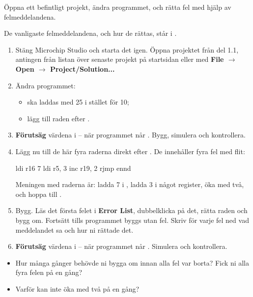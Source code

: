 
\label{lab3:d1-2}
Öppna ett befintligt projekt, ändra programmet, och rätta fel med hjälp av felmeddelandena.

De vanligaste felmeddelandena, och hur de rättas, står i .

\begin{enumerate}
  \item Stäng Microchip Studio och starta det igen. Öppna projektet från del 1.1, antingen från
    listan över senaste projekt på startsidan eller med \textbf{File $\rightarrow$ Open
    $\rightarrow$ Project/Solution...}
  \item Ändra programmet:
    \begin{itemize}
      \item {} ska laddas med 25 i stället för 10;
      \item lägg till raden  efter .
    \end{itemize}
  \item \textbf{Förutsäg} värdena i -- när programmet når . Bygg,
    simulera och kontrollera.
  \item Lägg nu till de här fyra raderna direkt efter . De innehåller fyra fel
    med flit:
\begin{asmcode}
    ldi r16 7
    ldi r5, 3
    inc r19, 2
    rjmp ennd
\end{asmcode}
    Meningen med raderna är: ladda 7 i , ladda 3 i något register, öka  med
    två, och hoppa till .
  \item Bygg. Läs det första felet i \textbf{Error List}, dubbelklicka på det, rätta raden och bygg
    om. Fortsätt tills programmet byggs utan fel. Skriv för varje fel ned vad meddelandet sa och
    hur ni rättade det.
  \item \textbf{Förutsäg} värdena i -- när programmet når . Simulera
    och kontrollera.
\end{enumerate}

\begin{itemize}
  \item Hur många gånger behövde ni bygga om innan alla fel var borta? Fick ni alla fyra felen på
    en gång?
  \item Varför kan  inte öka med två på en gång?
\end{itemize}

